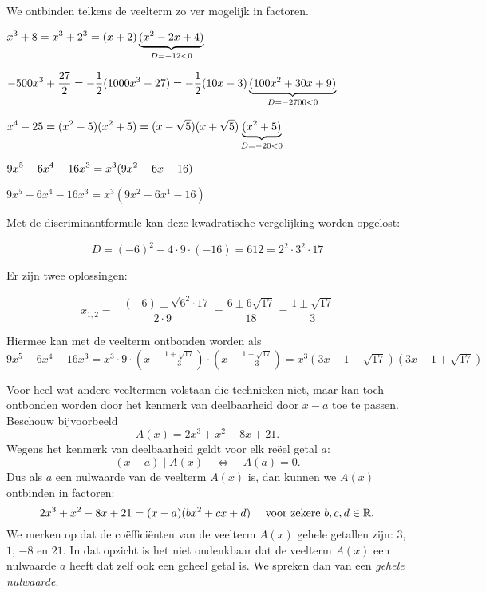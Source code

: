 \documentclass{ximera}
\begin{document}
\begin{example} 
We ontbinden telkens de veelterm zo ver mogelijk in factoren. 

\begin{question} \( \displaystyle x^3 + 8 = x^3 + 2^3 = (x+2)\underbrace{(x^2-2x+4)}_{D = -12 < 0}                                                         \) \end{question}
\begin{question} \( \displaystyle -500x^3 + \frac{27}{2} = -\frac{1}{2}(1000x^3 - 27) = -\frac{1}{2}(10x-3)\underbrace{(100x^2 + 30x + 9)}_{D = -2700 < 0} \) \end{question}
\begin{question} \( \displaystyle x^4-25 = (x^2 - 5)(x^2+5) = (x-\sqrt{5})(x+\sqrt{5})\underbrace{(x^2+5)}_{D = -20 < 0}                                   \) \end{question}
\begin{question} \( \displaystyle 9x^5 - 6x^4 - 16x^3 = x^3(9x^2-6x-16)                                                                                    \) \end{question}
\begin{question} \( 9x^5 - 6x^4 - 16x^3 = x^3(9x^2 - 6x^1 - 16) \)              

Met de discriminantformule kan deze kwadratische vergelijking worden opgelost: 

\[
D = (-6)^2-4\cdot 9 \cdot (-16) = 612 = 2^2 \cdot 3^2 \cdot 17 
\]

Er zijn twee oplossingen: 

\[
x_{1,2} = \frac{-(-6) \pm \sqrt{6^2 \cdot 17}}{2 \cdot 9} = \frac{6 \pm 6\sqrt{17}}{18} = \frac{1 \pm \sqrt{17}}{3} 
\]

Hiermee kan met de veelterm ontbonden worden als \(9x^5 - 6x^4 - 16x^3 = x^3 \cdot 9 \cdot \left(x-\frac{1+\sqrt{17}}{3}\right)\cdot\left(x-\frac{1-\sqrt{17}}{3}\right) = x^3(3x-1-\sqrt{17})(3x-1+\sqrt{17})\)

\end{question}
\end{example} 

Voor heel wat andere veeltermen volstaan die technieken niet, maar kan toch ontbonden worden door het kenmerk van deelbaarheid door \(x-a\) toe te passen. Beschouw bijvoorbeeld
\[
A(x) = 2x^3 +x^2 - 8x + 21.
\]
Wegens het kenmerk van deelbaarheid geldt voor elk reëel getal \(a\): 
\[
(x-a) \mid A(x) \quad \Leftrightarrow \quad A(a) = 0. 
\]
Dus als \(a\) een nulwaarde van de veelterm \(A(x)\) is, dan kunnen we \(A(x)\) ontbinden in factoren:
\[
2x^3 +x^2 - 8x + 21 = (x-a)(bx^2 + cx + d) %
\quad 
\text{ voor zekere } b,c,d \in \R.
\]
We merken op dat de coëfficiënten van de veelterm \(A(x)\) gehele getallen zijn: \(3\), \(1\), \(-8\) en \(21\). In dat opzicht is het niet ondenkbaar dat de veelterm \(A(x)\) een nulwaarde \(a\) heeft dat zelf ook een geheel getal is. We spreken dan van een \textit{ gehele nulwaarde}.
\end{document}
